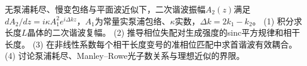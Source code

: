 无泵浦耗尽、慢变包络与平面波近似下，二次谐波振幅\(A_2(z)\)满足\(dA_2/dz=i\kappa A_1^2 e^{i\Delta k z}\)，\(A_1\)为常量实泵浦包络、\(\kappa\)实数，\(\Delta k=2k_1-k_2\)。
(1) 积分求长度\(L\)晶体的二次谐波复幅。
(2) 推导相位失配对生成强度的sinc平方规律和相干长度。
(3) 在非线性系数每个相干长度变号的准相位匹配中求首谐波有效耦合。
(4) 讨论泵浦耗尽、Manley–Rowe光子数关系与理想近似的界限。
